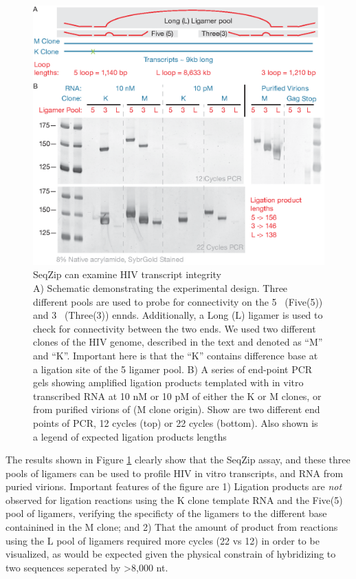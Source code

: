 	  \begin{figure}[htbp] %
  	  \centering 
	    \includegraphics{Figures/SeqZipMethod/HIVviaSeqZip.eps}
    	\caption[SeqZip can examine HIV transcript integrity]
    	{
	      SeqZip can examine HIV transcript integrity\\
      	A) Schematic demonstrating the experimental design. Three different pools are used to probe for connectivity on the 5\textprime~ (Five(5)) and 3\textprime~ (Three(3)) ennds. Additionally, a Long (L) ligamer is used to check for connectivity between the two ends. We used two different clones of the HIV genome, described in the text and denoted as ``M'' and ``K''. Important here is that the ``K'' contains difference base at a ligation site of the 5 ligamer pool.
        B) A series of end-point PCR gels showing amplified ligation products templated with in vitro transcribed RNA at 10 nM or 10 pM of either the K or M clones, or from purified virions of (M clone origin). Show are two different end points of PCR, 12 cycles (top) or 22 cycles (bottom). Also shown is a legend of expected ligation products lengths
    		}
    	\label{fig:Hiv tx via SeqZip}
  		\end{figure}

  The results shown in Figure \ref{fig:Hiv tx via SeqZip} clearly show that the SeqZip assay, and these three pools of ligamers can be used to profile HIV in vitro transcripts, and RNA from puried virions. Important features of the figure are 1) Ligation products are \textit{not} observed for ligation reactions using the K clone template RNA and the Five(5) pool of ligamers, verifying the specificty of the ligamers to the different base containined in the M clone; and 2) That the amount of product from reactions using the L pool of ligamers required more cycles (22 vs 12) in order to be visualized, as would be expected given the physical constrain of hybridizing to two sequences seperated by >8,000 nt. 

